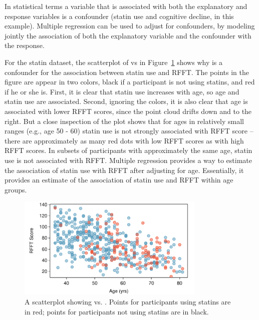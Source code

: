 
In statistical terms a variable that is associated with both the explanatory and response variables is a confounder (statin use and cognitive decline, in this example).  Multiple regression can be used to adjust for confounders, by modeling jointly the association of both the explanatory variable and the confounder with the response.  

For the statin dataset, the scatterplot of  vs  in Figure~\ref{statinAgeRFFTConfounderPlot} shows why  is a confounder for the association between statin use and RFFT.  The points in the figure are appear in two colors, black if a participant is not using statins, and red if he or she is.  First, it is clear that statin use increases with age, so age and statin use are associated.  Second, ignoring the colors, it is also clear that age is associated with lower RFFT scores, since the point cloud drifts down and to the right.  But a close inspection of the plot shows that for ages in relatively small ranges (e.g., age 50 - 60) statin use is not strongly associated with RFFT score -- there are approximately as many red dots with low RFFT scores as with high RFFT scores.  In subsets of participants with approximately the same age, statin use is not associated with RFFT. Multiple regression provides a way to estimate the association of statin use with RFFT after adjusting for age.  Essentially, it provides an estimate of the association of statin use and RFFT within age groups.

\begin{figure}[h!]
	\centering
	\includegraphics[width=0.8\textwidth]
	{ch_multiple_linear_regression_oi_biostat/figures/statinAgeRFFTConfounderPlot/statinAgeRFFTConfounderPlot}
	\caption{A scatterplot showing  vs. . Points for participants using statins are in red; points for participants not using statins are in black.}
	\label{statinAgeRFFTConfounderPlot}
\end{figure}

